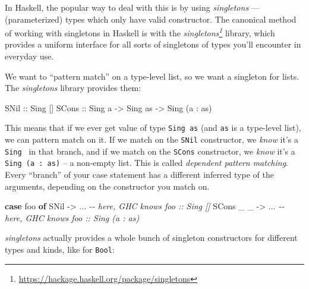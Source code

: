 \documentclass[]{article}
\newenvironment{Shaded}{}{}
\newcommand{\CommentTok}[1]{\textcolor[rgb]{0.38,0.63,0.69}{\textit{#1}}}
\newcommand{\DataTypeTok}[1]{\textcolor[rgb]{0.56,0.13,0.00}{#1}}
\newcommand{\KeywordTok}[1]{\textcolor[rgb]{0.00,0.44,0.13}{\textbf{#1}}}
\newcommand{\NormalTok}[1]{#1}
\newcommand{\OperatorTok}[1]{\textcolor[rgb]{0.40,0.40,0.40}{#1}}
\newcommand{\OtherTok}[1]{\textcolor[rgb]{0.00,0.44,0.13}{#1}}
\renewcommand{\href}[2]{#2\footnote{\url{#1}}}
\begin{document}
In Haskell, the popular way to deal with this is by using \emph{singletons} ---
(parameterized) types which only have valid constructor. The canonical method of
working with singletons in Haskell is with the
\emph{\href{https://hackage.haskell.org/package/singletons}{singletons}}
library, which provides a uniform interface for all sorts of singletons of types
you'll encounter in everyday use.

We want to ``pattern match'' on a type-level list, so we want a singleton for
lists. The \emph{singletons} library provides them:

\begin{Shaded}
\begin{Highlighting}[]
\DataTypeTok{SNil}\OtherTok{  ::} \DataTypeTok{Sing}\NormalTok{ \textquotesingle{}[]}
\DataTypeTok{SCons}\OtherTok{ ::} \DataTypeTok{Sing}\NormalTok{ a }\OtherTok{{-}\textgreater{}} \DataTypeTok{Sing}\NormalTok{ as }\OtherTok{{-}\textgreater{}} \DataTypeTok{Sing}\NormalTok{ (a \textquotesingle{}}\OperatorTok{:}\NormalTok{ as)}
\end{Highlighting}
\end{Shaded}

This means that if we ever get value of type \texttt{Sing\ as} (and \texttt{as}
is a type-level list), we can pattern match on it. If we match on the
\texttt{SNil} constructor, we \emph{know} it's a
\texttt{Sing\ \textquotesingle{}{[}{]}} in that branch, and if we match on the
\texttt{SCons} constructor, we \emph{know} it's a
\texttt{Sing\ (a\ \textquotesingle{}:\ as)} -- a non-empty list. This is called
\emph{dependent pattern matching}. Every ``branch'' of your case statement has a
different inferred type of the arguments, depending on the constructor you match
on.

\begin{Shaded}
\begin{Highlighting}[]
\KeywordTok{case}\NormalTok{ foo }\KeywordTok{of}
  \DataTypeTok{SNil}      \OtherTok{{-}\textgreater{}} \OperatorTok{...}   \CommentTok{{-}{-} here, GHC knows \textasciigrave{}foo :: Sing \textquotesingle{}[]\textasciigrave{}}
  \DataTypeTok{SCons}\NormalTok{ \_ \_ }\OtherTok{{-}\textgreater{}} \OperatorTok{...}   \CommentTok{{-}{-} here, GHC knows \textasciigrave{}foo :: Sing (a \textquotesingle{}: as)\textasciigrave{}}
\end{Highlighting}
\end{Shaded}

\emph{singletons} actually provides a whole bunch of singleton constructors for
different types and kinds, like for \texttt{Bool}:
\end{document}
